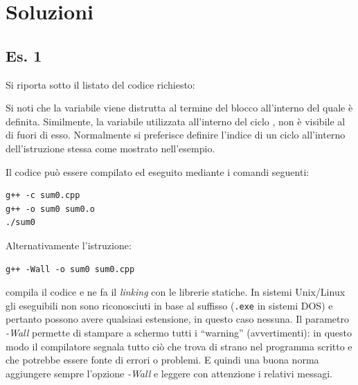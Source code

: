 \newpage

\section*{Soluzioni}

\subsection*{Es. 1}
Si riporta sotto il listato del codice richiesto:
%
\lstset{basicstyle=\scriptsize\sf}

\lstset{basicstyle=\sf}
%
Si noti
che la variabile  viene distrutta al termine del blocco  all'interno del quale \`e definita. Similmente, la variabile  utilizzata all'interno del ciclo , non \`e visibile al di fuori di esso. Normalmente si preferisce definire l'indice di un ciclo  all'interno dell'istruzione stessa come mostrato nell'esempio.

Il codice pu\`o essere compilato ed eseguito mediante i comandi seguenti:
\begin{verbatim}
g++ -c sum0.cpp
g++ -o sum0 sum0.o
./sum0
\end{verbatim}
Alternativamente l'istruzione:
\begin{verbatim}
g++ -Wall -o sum0 sum0.cpp
\end{verbatim}
compila il codice e ne fa il \emph{linking} con le librerie statiche.
In sistemi Unix/Linux gli eseguibili non sono riconosciuti in base al
suffisso (\texttt{.exe} in sistemi DOS) e pertanto possono avere
qualsiasi estensione, in questo caso nessuna.
Il parametro \emph{-Wall} permette di stampare
a schermo tutti i ``warning'' (avvertimenti): in questo modo il
compilatore segnala tutto ci\`o che trova di strano nel programma scritto e che
potrebbe essere fonte di errori o problemi. E quindi una buona norma aggiungere
sempre l'opzione \emph{-Wall} e leggere con attenzione i relativi messagi.

